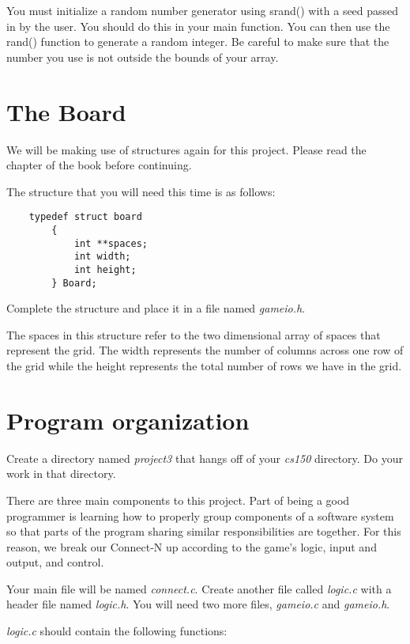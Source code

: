 \documentclass{article}
\begin{document}
You must initialize a random number generator using srand() with a seed passed in by the user. You should do this in your main function. You can then use the rand() 
function to generate a random integer. Be careful to make sure that the number you use is not outside the bounds of your array. 

\section*{The Board}

We will be making use of structures again for this project. 
Please read the 
chapter of the book before continuing.

The structure that you will need this time is as follows:

\begin{verbatim}
    typedef struct board
        {
        	int **spaces;
        	int width;
        	int height;
        } Board;
\end{verbatim}

Complete the structure and place it in a file named {\it gameio.h}.

The spaces in this structure refer to the two dimensional array of spaces
that represent the grid. The width represents the number of columns across
one row of the grid while the height represents the total number of rows
we have in the grid. 

\section*{Program organization}

Create a directory named {\it project3} that hangs off of your 
{\it cs150} directory. Do your work in that directory.

There are three main components to this project. Part of being a good
programmer is learning how to properly group components of a software
system so that parts of the program sharing similar responsibilities 
are together. For this reason, we break our Connect-N up according
to the game's logic, input and output, and control. 

Your main file will be named {\it connect.c}. Create another file called
{\it logic.c} with a header file named {\it logic.h}. You will need two more
files, {\it gameio.c} and {\it gameio.h}.

{\it logic.c} should contain the following functions:
\end{document}
